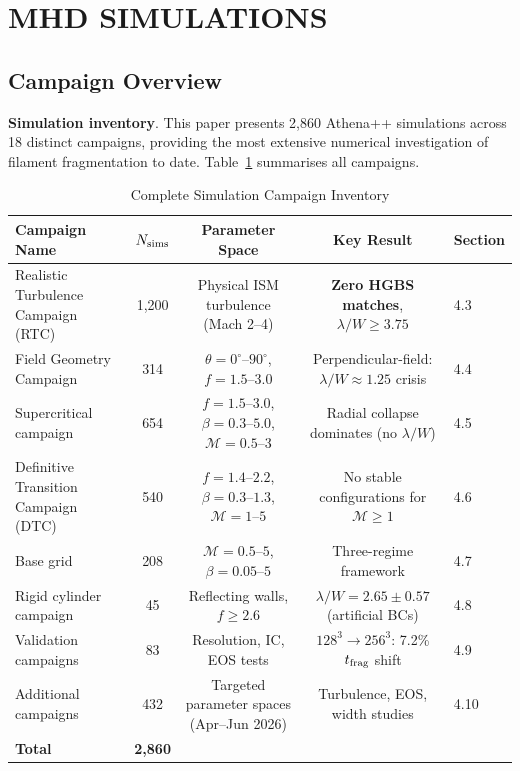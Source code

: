 \documentclass[twocolumn,longtitle,usenatbib]{mnras}
\begin{document}
\section{MHD SIMULATIONS}

\subsection{Campaign Overview}

\textbf{Simulation inventory}. This paper presents 2,860 Athena++ simulations across 18 distinct campaigns, providing the most extensive numerical investigation of filament fragmentation to date. Table~\ref{tab:campaign_inventory} summarises all campaigns.

\begin{table}
\caption{Complete Simulation Campaign Inventory}
\label{tab:campaign_inventory}
\small
\begin{tabular}{lcccl}
\toprule
Campaign Name & $N_{\rm sims}$ & Parameter Space & Key Result & Section \\
\midrule
Realistic Turbulence Campaign (RTC) & 1,200 & Physical ISM turbulence (Mach 2--4) & \textbf{Zero HGBS matches}, $\lambda/W\geq3.75$ & 4.3 \\
Field Geometry Campaign & 314 & $\theta=0^{\circ}\mbox{--}90^{\circ}$, $f=1.5\mbox{--}3.0$ & Perpendicular-field: $\lambda/W\approx1.25$ crisis & 4.4 \\
Supercritical campaign & 654 & $f=1.5\mbox{--}3.0$, $\beta=0.3\mbox{--}5.0$, $\mathcal{M}=0.5\mbox{--}3$ & Radial collapse dominates (no $\lambda/W$) & 4.5 \\
Definitive Transition Campaign (DTC) & 540 & $f=1.4\mbox{--}2.2$, $\beta=0.3\mbox{--}1.3$, $\mathcal{M}=1\mbox{--}5$ & No stable configurations for $\mathcal{M}\geq1$ & 4.6 \\
Base grid & 208 & $\mathcal{M}=0.5\mbox{--}5$, $\beta=0.05\mbox{--}5$ & Three-regime framework & 4.7 \\
Rigid cylinder campaign & 45 & Reflecting walls, $f\geq2.6$ & $\lambda/W=2.65\pm0.57$ (artificial BCs) & 4.8 \\
Validation campaigns & 83 & Resolution, IC, EOS tests & $128^3\to256^3$: 7.2\% $t_{\rm frag}$ shift & 4.9 \\
Additional campaigns & 432 & Targeted parameter spaces (Apr--Jun 2026) & Turbulence, EOS, width studies & 4.10 \\
\midrule
\textbf{Total} & \textbf{2,860} &  &  &  \\
\bottomrule
\end{tabular}
\end{table}
\end{document}
